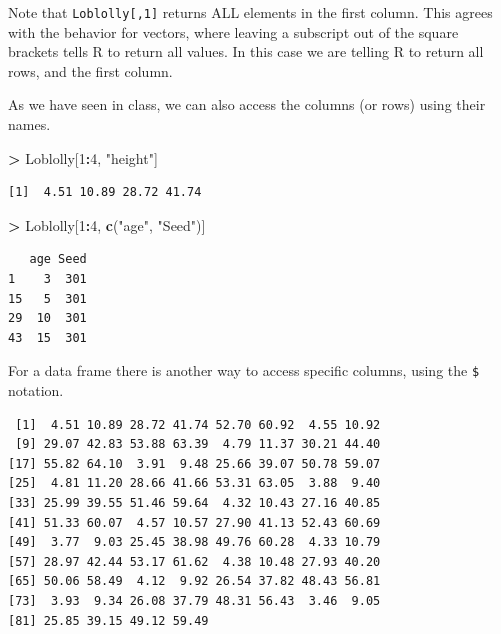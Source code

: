 \documentclass[]{krantz}
\makeatletter
\newenvironment{Shaded}{\begin{snugshade}}{\end{snugshade}}
\newcommand{\DecValTok}[1]{\textcolor[rgb]{0.06,0.06,0.06}{#1}}
\newcommand{\KeywordTok}[1]{\textcolor[rgb]{0.27,0.27,0.27}{\textbf{#1}}}
\newcommand{\NormalTok}[1]{#1}
\newcommand{\OperatorTok}[1]{\textcolor[rgb]{0.43,0.43,0.43}{\textbf{#1}}}
\newcommand{\StringTok}[1]{\textcolor[rgb]{0.5,0.5,0.5}{#1}}
\newenvironment{kframe}{%
\medskip{}
\setlength{\fboxsep}{.8em}
 \def\at@end@of@kframe{}%
 \ifinner\ifhmode%
  \def\at@end@of@kframe{\end{minipage}}%
  \begin{minipage}{\columnwidth}%
 \fi\fi%
 \def\FrameCommand##1{\hskip\@totalleftmargin \hskip-\fboxsep
 \colorbox{shadecolor}{##1}\hskip-\fboxsep
     \hskip-\linewidth \hskip-\@totalleftmargin \hskip\columnwidth}%
 \MakeFramed {\advance\hsize-\width
   \@totalleftmargin\z@ \linewidth\hsize
   \@setminipage}}%
 {\par\unskip\endMakeFramed%
 \at@end@of@kframe}
\renewenvironment{Shaded}{\begin{kframe}}{\end{kframe}}
\makeatother
\begin{document}
Note that \texttt{Loblolly{[},1{]}} returns ALL elements in the first column. This agrees with the behavior for vectors, where leaving a subscript out of the square brackets tells R to return all values. In this case we are telling R to return all rows, and the first column.

As we have seen in class, we can also access the columns (or rows) using their names.

\begin{Shaded}
\begin{Highlighting}[]
\OperatorTok{>}\StringTok{ }\NormalTok{Loblolly[}\DecValTok{1}\OperatorTok{:}\DecValTok{4}\NormalTok{, }\StringTok{"height"}\NormalTok{]}
\end{Highlighting}
\end{Shaded}

\begin{verbatim}
[1]  4.51 10.89 28.72 41.74
\end{verbatim}

\begin{Shaded}
\begin{Highlighting}[]
\OperatorTok{>}\StringTok{ }\NormalTok{Loblolly[}\DecValTok{1}\OperatorTok{:}\DecValTok{4}\NormalTok{, }\KeywordTok{c}\NormalTok{(}\StringTok{"age"}\NormalTok{, }\StringTok{"Seed"}\NormalTok{)]}
\end{Highlighting}
\end{Shaded}

\begin{verbatim}
   age Seed
1    3  301
15   5  301
29  10  301
43  15  301
\end{verbatim}

For a data frame there is another way to access specific columns, using the \texttt{\$} notation.

\begin{Shaded}
\end{Shaded}

\begin{verbatim}
 [1]  4.51 10.89 28.72 41.74 52.70 60.92  4.55 10.92
 [9] 29.07 42.83 53.88 63.39  4.79 11.37 30.21 44.40
[17] 55.82 64.10  3.91  9.48 25.66 39.07 50.78 59.07
[25]  4.81 11.20 28.66 41.66 53.31 63.05  3.88  9.40
[33] 25.99 39.55 51.46 59.64  4.32 10.43 27.16 40.85
[41] 51.33 60.07  4.57 10.57 27.90 41.13 52.43 60.69
[49]  3.77  9.03 25.45 38.98 49.76 60.28  4.33 10.79
[57] 28.97 42.44 53.17 61.62  4.38 10.48 27.93 40.20
[65] 50.06 58.49  4.12  9.92 26.54 37.82 48.43 56.81
[73]  3.93  9.34 26.08 37.79 48.31 56.43  3.46  9.05
[81] 25.85 39.15 49.12 59.49
\end{verbatim}
\end{document}

